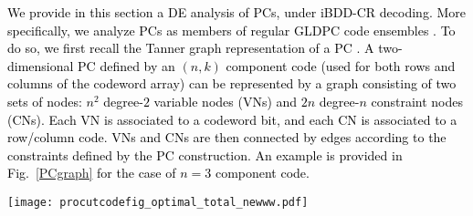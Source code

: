 \documentclass[journal]{IEEEtran}
\newcommand{\GL}{\textcolor{black}}
\newcommand{\AG}{\textcolor{black}}
\newcommand{\GLC}[1]{\textcolor{black}{\textbf{\textit{#1}}}}
\begin{document}

\GL{We provide in this section a DE analysis of PCs, under iBDD-CR decoding. More specifically, we analyze PCs as members of regular GLDPC code ensembles \cite{Lentmaier98:GLDPC}. To do so, we first recall the  Tanner graph representation of a PC \cite{Tanner1981}. A two-dimensional PC defined by an $(n,k)$ component code (used for both rows and columns of the codeword array) can be represented by a graph consisting of two sets of nodes: $n^2$ degree-$2$ variable nodes (VNs) and $2n$ degree-$n$ constraint nodes (CNs). Each VN is associated to a codeword bit, and each CN is associated to a row/column code. VNs and CNs are then connected by edges according to the constraints defined by the PC construction. An example is provided in Fig.~\ref{PCgraph} for the case \AG{of $n=3$ component code}.}

\begin{figure*}[t] \centering 
	\texttt{[image: procutcodefig\_optimal\_total\_newww.pdf]}
	\vspace{-1ex}
	\caption{(a) The PC code array with $9$ bits. (b) Tanner graph of the PC. $\mathsf{r_1}$, $\mathsf{r_2}$, and $\mathsf{r_3}$ ($\mathsf{c_1}$, $\mathsf{c_2}$, and $\mathsf{c_3}$) stand for the first, second, and third BCH row (column) \GL{constraint nodes}. \GL{A length-$8$ cycle is highlighted in the Tanner graph. (c) Tanner graph of a generic regular GLDPC code with $n^2$ degree-$2$ VNs and $2n$ degree-$n$ CNs.}}  %
	\label{PCgraph} 
\end{figure*}


\end{document}

